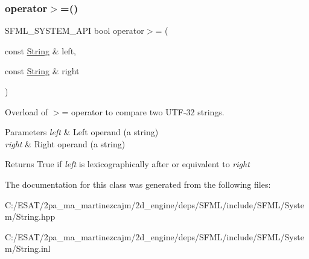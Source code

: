 \subsubsection{\texorpdfstring{operator$>$=()}{operator>=()}}
{\footnotesize\ttfamily S\+F\+M\+L\+\_\+\+S\+Y\+S\+T\+E\+M\+\_\+\+A\+PI bool operator$>$= (\begin{DoxyParamCaption}\item[{const \hyperlink{classsf_1_1_string}{String} \&}]{left,  }\item[{const \hyperlink{classsf_1_1_string}{String} \&}]{right }\end{DoxyParamCaption})\hspace{0.3cm}{\ttfamily [related]}}



Overload of $>$= operator to compare two U\+T\+F-\/32 strings. 


\begin{DoxyParams}{Parameters}
{\em left} & Left operand (a string) \\
\hline
{\em right} & Right operand (a string)\\
\hline
\end{DoxyParams}
\begin{DoxyReturn}{Returns}
True if {\itshape left} is lexicographically after or equivalent to {\itshape right} 
\end{DoxyReturn}


The documentation for this class was generated from the following files\+:\begin{DoxyCompactItemize}
\item 
C\+:/\+E\+S\+A\+T/2pa\+\_\+ma\+\_\+martinezcajm/2d\+\_\+engine/deps/\+S\+F\+M\+L/include/\+S\+F\+M\+L/\+System/String.\+hpp\item 
C\+:/\+E\+S\+A\+T/2pa\+\_\+ma\+\_\+martinezcajm/2d\+\_\+engine/deps/\+S\+F\+M\+L/include/\+S\+F\+M\+L/\+System/String.\+inl\end{DoxyCompactItemize}
